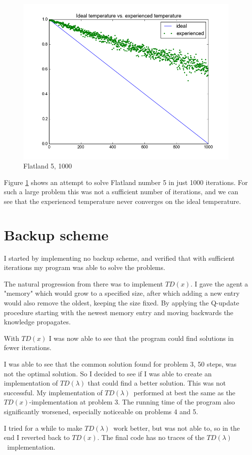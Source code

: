 \begin{figure}[t]
    \centering
    \includegraphics[width=\linewidth]{img/1kFail.png}
    \caption{Flatland 5, 1000}
    \label{fail}
\end{figure}

Figure \ref{fail} shows an attempt to solve Flatland number 5 in just 1000 iterations.
For such a large problem this was not a sufficient number of iterations,
and we can see that the experienced temperature never converges on the ideal temperature.

\section*{Backup scheme}
I started by implementing no backup scheme,
and verified that with sufficient iterations my program was able to solve the problems.

The natural progression from there was to implement $TD(x)$.
I gave the agent a "memory" which would grow to a specified size,
after which adding a new entry would also remove the oldest,
keeping the size fixed.
By applying the Q-update procedure starting with the newest memory entry and moving backwards
the knowledge propagates.

With $TD(x)$ I was now able to see that the program could find solutions in fewer iterations.

I was able to see that the common solution found for problem 3, 50 steps, was not the optimal solution.
So I decided to see if I was able to create an implementation of $TD(\lambda)$ that could find a better solution.
This was not successful.
My implementation of $TD(\lambda)$ performed at best the same as the $TD(x)$-implementation at problem 3.
The running time of the program also significantly worsened,
especially noticeable on problems 4 and 5.

I tried for a while to make $TD(\lambda)$ work better, but was not able to, so in the end I reverted back to $TD(x)$.
The final code has no traces of the $TD(\lambda)$ implementation.
